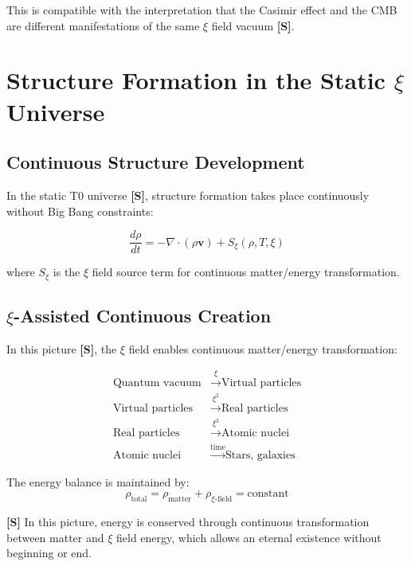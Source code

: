 	This is compatible with the interpretation that the Casimir effect and the CMB are different manifestations of the same $\xi$ field vacuum \textbf{[S]}.
	
	\section{Structure Formation in the Static $\xi$ Universe}
	
	\subsection{Continuous Structure Development}
	
	In the static T0 universe \textbf{[S]}, structure formation takes place continuously without Big Bang constraints:
	
	\begin{equation}
		\frac{d\rho}{dt} = -\nabla \cdot (\rho \mathbf{v}) + S_\xi(\rho, T, \xi)
	\end{equation}
	
	where $S_\xi$ is the $\xi$ field source term for continuous matter/energy transformation.
	
	\subsection{$\xi$-Assisted Continuous Creation}
	
	In this picture \textbf{[S]}, the $\xi$ field enables continuous matter/energy transformation:
	
	\begin{align}
		\text{Quantum vacuum} &\xrightarrow{\xi} \text{Virtual particles} \\
		\text{Virtual particles} &\xrightarrow{\xi^2} \text{Real particles} \\
		\text{Real particles} &\xrightarrow{\xi^3} \text{Atomic nuclei} \\
		\text{Atomic nuclei} &\xrightarrow{\text{time}} \text{Stars, galaxies}
	\end{align}
	
	The energy balance is maintained by:
	\begin{equation}
		\rho_{\text{total}} = \rho_{\text{matter}} + \rho_{\xi\text{-field}} = \text{constant}
	\end{equation}
	
	\begin{important}
		\textbf{[S]} In this picture, energy is conserved through continuous transformation between matter and $\xi$ field energy, which allows an eternal existence without beginning or end.
	\end{important}
	
